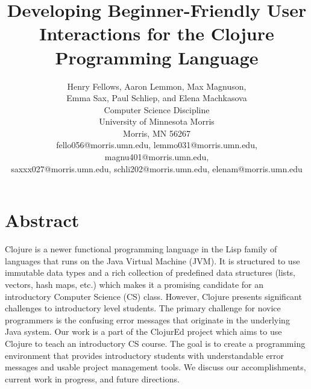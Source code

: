 \documentclass[12pt]{article}
\newcommand{\comment}[1]{{\bf \tt  {#1}}}
\newcommand{\alcomment}[1]{\textcolor{red}{\comment{Lemmon: {#1}}}}
\begin{document}
\pagestyle{plain}
%

\title{Developing Beginner-Friendly User Interactions for the Clojure Programming Language}
%
%

\author{
Henry Fellows, Aaron Lemmon, Max Magnuson, \\
	Emma Sax, Paul Schliep, and Elena Machkasova \\
Computer Science Discipline \\
University of Minnesota Morris\\
Morris, MN 56267\\
fello056@morris.umn.edu, lemmo031@morris.umn.edu, magnu401@morris.umn.edu, \\
	saxxx027@morris.umn.edu, schli202@morris.umn.edu, elenam@morris.umn.edu
}
\date{}
\maketitle
\thispagestyle{empty}

\section*{\centering Abstract}
Clojure is a newer functional programming language in the Lisp family
of languages that runs on the Java Virtual Machine (JVM). 
It is structured to use immutable data types and a rich collection of
predefined data structures (lists, vectors, hash maps, etc.) which
makes it a promising candidate for an introductory Computer Science
(CS) class. However, Clojure presents significant challenges to
introductory level students. The primary challenge for novice
programmers is the confusing error messages that originate in the
underlying Java system.
Our work is a part of the ClojurEd project which aims to use Clojure
to teach an introductory CS course. The goal is to create a
programming
environment that provides introductory students with understandable
error messages and usable project management tools. 
We discuss our accomplishments, current work in progress, and future
directions. 
\end{document}
